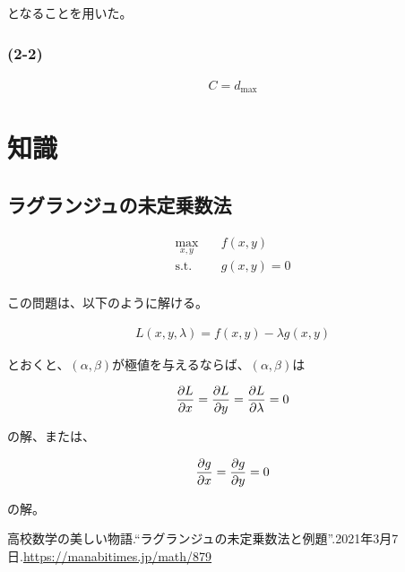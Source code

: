 \documentclass[a4paper, 10pt, dvipdfmx]{jlreq}
\begin{document}
となることを用いた。

\subsubsection*{(2-2)}

\begin{align*}
  C=d_{\text{max}}
\end{align*}

\section{知識}

\subsection{ラグランジュの未定乗数法}

\begin{align*}
  \max_{x,y} \quad  & f(x,y)     \\
  \text{s.t.} \quad & g(x,y) = 0 \\
\end{align*}

この問題は、以下のように解ける。

\begin{align*}
  L(x,y,\lambda) = f(x,y) - \lambda g(x,y)
\end{align*}

とおくと、$(\alpha,\beta)$が極値を与えるならば、$(\alpha,\beta)$は

\begin{align*}
  \pdv{L}{x} = \pdv{L}{y} = \pdv{L}{\lambda} = 0
\end{align*}

の解、または、

\begin{align*}
  \pdv{g}{x} = \pdv{g}{y} = 0
\end{align*}

の解。\cite{site:1}

\begin{thebibliography}{9}
  高校数学の美しい物語.“ラグランジュの未定乗数法と例題”.2021年3月7日.\url{https://manabitimes.jp/math/879}
\end{thebibliography}
\end{document}
